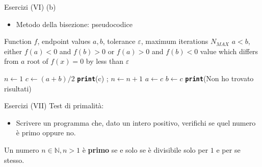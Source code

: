 \begin{frame}{Esercizi (VI) (b)}
  \begin{itemize}
    \item Metodo della bisezione: pseudocodice
  \end{itemize}

  \begin{scriptsize}
    \begin{center}
      \begin{minipage}{8cm}
	\begin{algorithmic}[1]
	  \Require Function $f$, endpoint values $a, b$, tolerance $\varepsilon$, maximum iterations $N_{MAX}$
		    $a < b$, either $f(a) < 0$ and $f(b) > 0$ or $f(a) > 0$ and $f(b) < 0$
	  \Ensure value which differs from $a$ root of $f(x)=0$ by less than $\varepsilon$
    
	  \State $n \gets 1$
	    \State $c \gets (a + b)/2$
	      \State \texttt{\textbf{print}}(c)
	      \State \Return;
	    \EndIf
	    \State $n \gets n + 1$
	      \State $a \gets c$
	    \Else 
	      \State $b \gets c$
	    \EndIf
	  \EndWhile
	  \State \texttt{\textbf{print}}(Non ho trovato risultati)
	\end{algorithmic}
      \end{minipage}
    \end{center}
  \end{scriptsize}

\end{frame}

\begin{frame}{Esercizi (VII)}
  Test di primalità:
  \begin{itemize}
    \item Scrivere un programma che, dato un intero positivo, verifichi se quel numero è primo oppure no.
  \end{itemize}

   Un numero $n \in \mathbb{N}, n > 1$ \`e \textbf{primo} se e solo se \`e divisibile solo per $1$ e per
   se stesso.
\end{frame}
